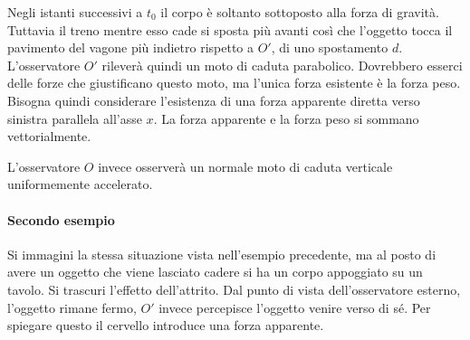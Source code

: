\documentclass[10pt,a4paper]{book}
\begin{document}
Negli istanti successivi a $t_0$ il corpo è soltanto sottoposto alla forza di gravità. Tuttavia il treno mentre esso cade si sposta più avanti così che l'oggetto tocca il pavimento del vagone più indietro rispetto a $O'$, di uno spostamento $d$. L'osservatore $O'$ rileverà quindi un moto di caduta parabolico. Dovrebbero esserci delle forze che giustificano questo moto, ma l'unica forza esistente è la forza peso. Bisogna quindi considerare l'esistenza di una forza apparente diretta verso sinistra parallela all'asse $x$. La forza apparente e la forza peso si sommano vettorialmente.

L'osservatore $O$ invece osserverà un normale moto di caduta verticale uniformemente accelerato.

\paragraph{Secondo esempio} Si immagini la stessa situazione vista nell'esempio precedente, ma al posto di avere un oggetto che viene lasciato cadere si ha un corpo appoggiato su un tavolo. Si trascuri l'effetto dell'attrito. Dal punto di vista dell'osservatore esterno, l'oggetto rimane fermo, $O'$ invece percepisce l'oggetto venire verso di sé. Per spiegare questo il cervello introduce una forza apparente.
\end{document}
